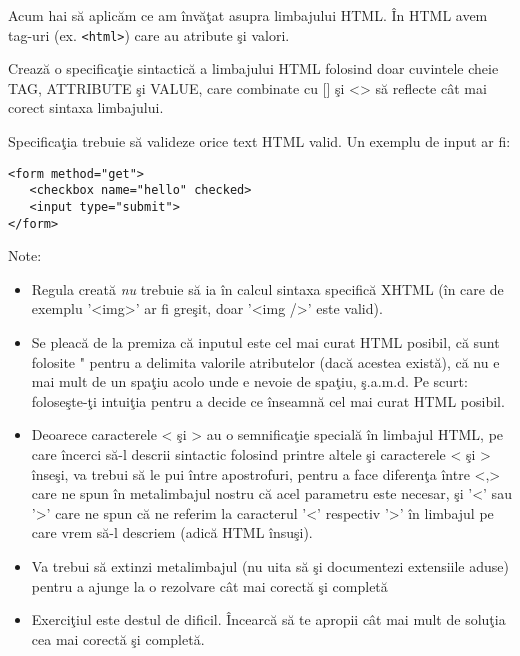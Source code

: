 \begin{Exercise}[title={Sintaxa HTML},label={ex:sintaxa_html},difficulty=3]
Acum hai să aplicăm ce am învăţat asupra limbajului HTML. În HTML avem
tag-uri (ex. \texttt{<html>}) care au atribute şi valori.

\Question Crează o specificaţie sintactică a limbajului HTML folosind
doar cuvintele cheie TAG, ATTRIBUTE şi VALUE, care combinate
cu [] şi <> să reflecte cât mai corect sintaxa limbajului.

Specificaţia trebuie să valideze orice text HTML valid.
Un exemplu de input ar fi:
\begin{verbatim}
<form method="get">
   <checkbox name="hello" checked>
   <input type="submit">
</form>
\end{verbatim}
\ExeText
Note:
\begin{itemize}
\item Regula creată \textit{nu} trebuie să ia în calcul sintaxa
specifică XHTML (în care de exemplu '<img>' ar fi greşit, doar '<img />' este valid).
\item Se pleacă de la premiza că inputul este cel mai curat HTML posibil, că
sunt folosite " pentru a delimita valorile atributelor (dacă acestea există), că
nu e mai mult de un spaţiu acolo unde e nevoie de spaţiu, ş.a.m.d. Pe scurt:
foloseşte-ţi intuiţia pentru a decide ce înseamnă {\glqq}cel mai curat HTML posibil{\grqq}.
\item Deoarece caracterele < şi > au o semnificaţie specială în limbajul HTML, pe
care încerci să-l descrii sintactic folosind printre altele
şi caracterele < şi > înseşi, va trebui să le pui între apostrofuri, pentru a face
diferenţa între <,> care ne spun în metalimbajul nostru
că acel parametru este necesar, şi '<' sau '>' care
ne spun că ne referim la caracterul '<' respectiv '>' în limbajul pe care
vrem să-l descriem (adică HTML însuşi).
\item Va trebui să extinzi metalimbajul (nu uita să şi documentezi extensiile aduse)
pentru a ajunge la o rezolvare cât mai corectă şi completă
\item Exerciţiul este destul de dificil. Încearcă să te apropii cât mai mult de soluţia
cea mai corectă şi completă.
\end{itemize}
\end{Exercise}
